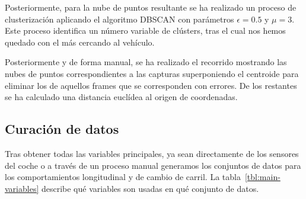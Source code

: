Posteriormente, para la nube de puntos resultante se ha realizado un proceso de clusterización aplicando el algoritmo DBSCAN con parámetros $\epsilon = 0.5$ y $\mu = 3$. Este proceso identifica un número variable de clústers, tras el cual nos hemos quedado con el más cercando al vehículo.

Posteriormente y de forma manual, se ha realizado el recorrido mostrando las nubes de puntos correspondientes a las capturas superponiendo el centroide para eliminar los de aquellos frames que se corresponden con errores. De los restantes se ha calculado una distancia euclídea al origen de coordenadas.

\subsection{Curación de datos}

Tras obtener todas las variables principales, ya sean directamente de los sensores del coche o a través de un proceso manual generamos los conjuntos de datos para los comportamientos longitudinal y de cambio de carril. La tabla~\ref{tbl:main-variables} describe qué variables son usadas en qué conjunto de datos.

